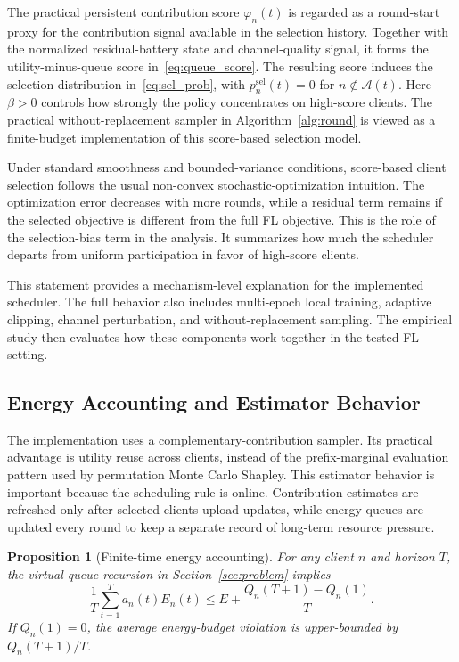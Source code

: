 \documentclass[journal]{IEEEtran}
\newtheorem{proposition}{Proposition}
\begin{document}
The practical persistent contribution score $\varphi_n(t)$ is regarded as a round-start proxy for the contribution signal available in the selection history. Together with the normalized residual-battery state and channel-quality signal, it forms the utility-minus-queue score in~\eqref{eq:queue_score}. The resulting score induces the selection distribution in~\eqref{eq:sel_prob}, with $p_n^{\mathrm{sel}}(t)=0$ for $n\notin\mathcal{A}(t)$. Here $\beta > 0$ controls how strongly the policy concentrates on high-score clients. The practical without-replacement sampler in Algorithm~\ref{alg:round} is viewed as a finite-budget implementation of this score-based selection model.

Under standard smoothness and bounded-variance conditions, score-based client selection follows the usual non-convex stochastic-optimization intuition. The optimization error decreases with more rounds, while a residual term remains if the selected objective is different from the full FL objective. This is the role of the selection-bias term in the analysis. It summarizes how much the scheduler departs from uniform participation in favor of high-score clients.

This statement provides a mechanism-level explanation for the implemented scheduler. The full behavior also includes multi-epoch local training, adaptive clipping, channel perturbation, and without-replacement sampling. The empirical study then evaluates how these components work together in the tested FL setting.

\subsection{Energy Accounting and Estimator Behavior}

The implementation uses a complementary-contribution sampler. Its practical advantage is utility reuse across clients, instead of the prefix-marginal evaluation pattern used by permutation Monte Carlo Shapley. This estimator behavior is important because the scheduling rule is online. Contribution estimates are refreshed only after selected clients upload updates, while energy queues are updated every round to keep a separate record of long-term resource pressure.

\begin{proposition}[Finite-time energy accounting]
For any client $n$ and horizon $T$, the virtual queue recursion in Section~\ref{sec:problem} implies
\begin{equation}
\frac{1}{T}\sum_{t=1}^{T}a_n(t)E_n(t)
\leq
\bar{E}+\frac{Q_n(T+1)-Q_n(1)}{T}.
\end{equation}
If $Q_n(1)=0$, the average energy-budget violation is upper-bounded by $Q_n(T+1)/T$.
\end{proposition}
\end{document}
